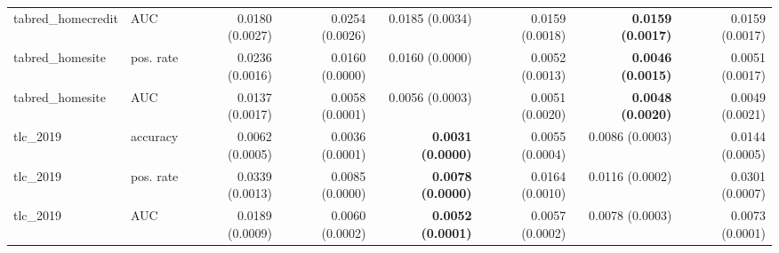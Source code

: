 \begin{table}[t]
{\begin{tabular}{llrrrrrr}
tabred\_homecredit & AUC & 0.0180 (0.0027) & 0.0254 (0.0026) & 0.0185 (0.0034) & 0.0159 (0.0018) & \textbf{0.0159 (0.0017)} & 0.0159 (0.0017) \\
tabred\_homesite & pos. rate & 0.0236 (0.0016) & 0.0160 (0.0000) & 0.0160 (0.0000) & 0.0052 (0.0013) & \textbf{0.0046 (0.0015)} & 0.0051 (0.0017) \\
tabred\_homesite & AUC & 0.0137 (0.0017) & 0.0058 (0.0001) & 0.0056 (0.0003) & 0.0051 (0.0020) & \textbf{0.0048 (0.0020)} & 0.0049 (0.0021) \\
tlc\_2019 & accuracy & 0.0062 (0.0005) & 0.0036 (0.0001) & \textbf{0.0031 (0.0000)} & 0.0055 (0.0004) & 0.0086 (0.0003) & 0.0144 (0.0005) \\
tlc\_2019 & pos. rate & 0.0339 (0.0013) & 0.0085 (0.0000) & \textbf{0.0078 (0.0000)} & 0.0164 (0.0010) & 0.0116 (0.0002) & 0.0301 (0.0007) \\
tlc\_2019 & AUC & 0.0189 (0.0009) & 0.0060 (0.0002) & \textbf{0.0052 (0.0001)} & 0.0057 (0.0002) & 0.0078 (0.0003) & 0.0073 (0.0001) \\
\bottomrule
\end{tabular}}
\end{table}
